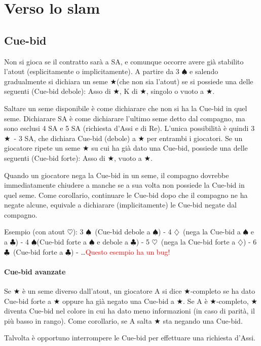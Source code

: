\documentclass[a4paper,10pt]{article}
\renewcommand{\c}{$\clubsuit$\xspace}
\renewcommand{\d}{$\diamondsuit$\xspace}
\newcommand{\h}{$\heartsuit$\xspace}
\newcommand{\s}{$\spadesuit$\xspace}
\renewcommand{\j}{$\bigstar$\xspace}
\newcommand{\note}[1]{\textcolor{red}{#1}}
\begin{document}
\pagebreak

\section{Verso lo slam}

\subsection{Cue-bid}

Non si gioca se il contratto sarà a SA, e comunque occorre avere già stabilito l'atout (esplicitamente o implicitamente). A partire da 3 \s e salendo gradualmente si dichiara un seme \j (che non sia l'atout) se si possiede una delle seguenti (Cue-bid debole): Asso di \j, K di \j, singolo o vuoto a \j.

Saltare un seme disponibile è come dichiarare che non si ha la Cue-bid in quel seme. Dichiarare SA è come dichiarare l'ultimo seme detto dal compagno, ma sono esclusi 4 SA e 5 SA (richiesta d'Assi e di Re). L'unica possibilità è quindi 3 \j\ - 3 SA, che dichiara Cue-bid (debole) a \j per entrambi i giocatori. Se un giocatore ripete un seme \j su cui ha già dato una Cue-bid, possiede una delle seguenti (Cue-bid forte): Asso di \j, vuoto a \j.

Quando un giocatore nega la Cue-bid in un seme, il compagno dovrebbe immediatamente chiudere a manche se a sua volta non possiede la Cue-bid in quel seme.
Come corollario, continuare le Cue-bid dopo che il compagno ne ha negate alcune, equivale a dichiarare (implicitamente) le Cue-bid negate dal compagno.

Esempio (con atout \h): 3 \s\  (Cue-bid debole a \s) - 4 \d\ (nega la Cue-bid a \s e a \c) - 4 \s (Cue-bid forte a \s e debole a \c) - 5 \h\ (nega la Cue-bid forte a \d) - 6 \c\ (Cue-bid forte a \c) - \dots \note{Questo esempio ha un bug!}

\paragraph{Cue-bid avanzate} Se \j è un seme diverso dall'atout, un giocatore A si dice \j-completo se ha dato Cue-bid forte a \j oppure ha già negato una Cue-bid a \j. Se A è \j-completo, \j diventa Cue-bid nel colore in cui ha dato meno informazioni (in caso di parità, il più basso in rango). Come corollario, se A salta \j sta negando una Cue-bid.
\vspace{4mm}

Talvolta è opportuno interrompere le Cue-bid per effettuare una richiesta d'Assi.
\end{document}
